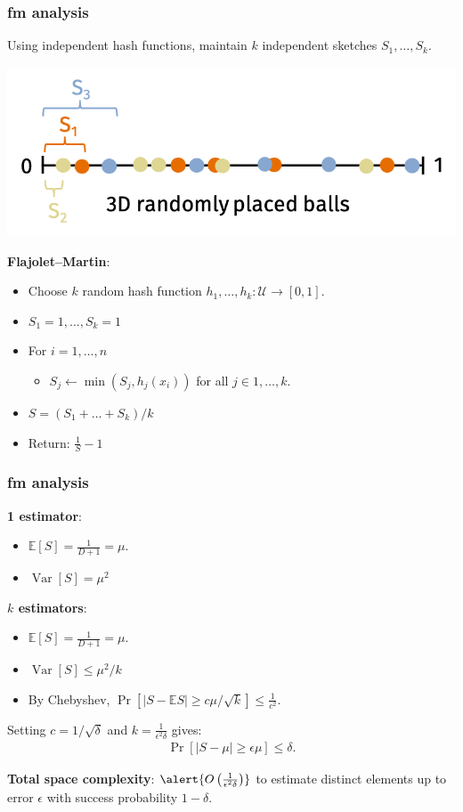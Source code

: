 \documentclass[handout,compress]{beamer}
\newcommand{\E}{\mathbb{E}}
\DeclareMathOperator{\Var}{Var}
\begin{document}
\begin{frame}
	\frametitle{fm analysis}
	Using independent hash functions, maintain $k$ independent sketches $S_1, \ldots, S_k$.
\vspace{-1em}
\begin{center}
	\includegraphics[width=.7\textwidth]{improvedFM.png}
\end{center}

\vspace{-1em}	
\textbf{Flajolet–Martin}:
		\begin{itemize}
			\item Choose $k$ random hash function $h_1, \ldots, h_k: \mathcal{U} \rightarrow [0,1]$.
			\item $S_1 = 1, \ldots, S_k = 1$ 
			\item For $i = 1, \ldots, n$
			\begin{itemize}
				\item $S_j \leftarrow \min(S_j, h_j(x_i))$ for all $j \in 1, \ldots, k$.
			\end{itemize} 
			\item $S = (S_1 + \ldots + S_k)/k$
			\item Return: $\frac{1}{S} - 1$
		\end{itemize}
\end{frame}

\begin{frame}
	\frametitle{fm analysis}
	\textbf{1 estimator}:
	\begin{itemize}
		\item $\E[S] = \frac{1}{D+1} = \mu.$
		\item $\Var[S] = \mu^2$
	\end{itemize}
	\textbf{$k$ estimators}:
	\begin{itemize}
		\item $\E[S] = \frac{1}{D+1} = \mu.$
		\item $\Var[S] \leq  \mu^2/k$
		\item By Chebyshev, $\Pr[|S - \E S| \geq c \mu/\sqrt{k}] \leq \frac{1}{c^2}$.
	\end{itemize}

	Setting $c = 1/\sqrt{\delta}$ and $k = \frac{1}{\epsilon^2\delta}$ gives:
	\begin{align*}
		\Pr[|S - \mu| \geq \epsilon \mu] \leq \delta.
	\end{align*}


\textbf{Total space complexity}: $\alert{O\left(\frac{1}{\epsilon^2\delta}\right)}$ to estimate distinct elements up to error $\epsilon$ with success probability $1-\delta$.
\end{frame}
\end{document}
